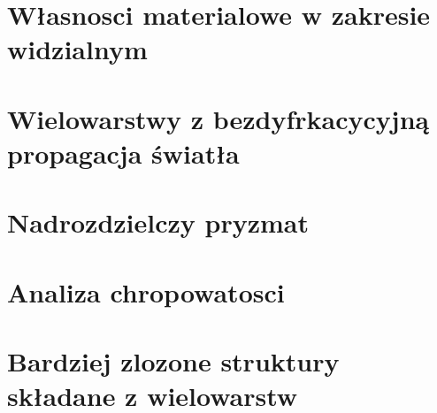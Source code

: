 
\section{Własnosci materialowe w zakresie widzialnym}

\section{Wielowarstwy z bezdyfrkacycyjną propagacja światła}

\section{Nadrozdzielczy pryzmat}

\section{Analiza chropowatosci}

\section{Bardziej zlozone struktury składane z wielowarstw}






